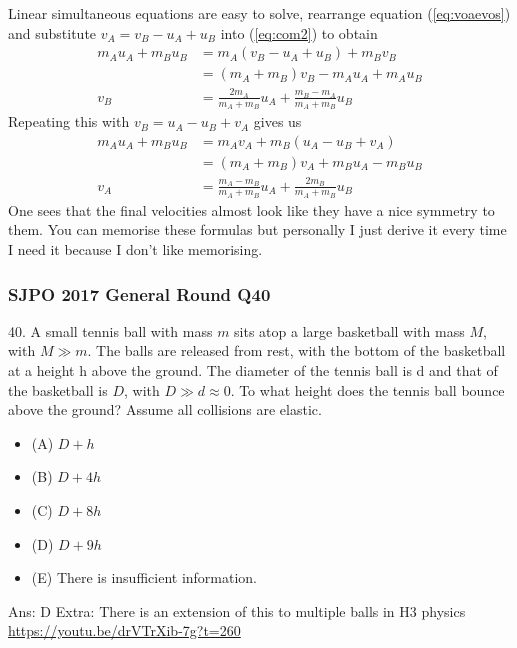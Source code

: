 \documentclass{article}
\begin{document}
Linear simultaneous equations are easy to solve, rearrange equation (\ref{eq:voaevos}) and substitute $v_A = v_B - u_A + u_B$ into (\ref{eq:com2}) to obtain
\begin{align}
    m_A u_A + m_B u_B &= m_A (v_B - u_A + u_B) + m_B v_B \\
    &= (m_A + m_B) v_B - m_A u_A + m_A u_B \\
    v_B &= \frac{2m_A}{m_A + m_B} u_A + \frac{m_B - m_A}{m_A + m_B} u_B 
\end{align}
Repeating this with $v_B = u_A - u_B + v_A$ gives us 
\begin{align}
    m_A u_A + m_B u_B &= m_A v_A + m_B (u_A - u_B + v_A) \\
    &= (m_A + m_B) v_A + m_B u_A - m_B u_B \\
    v_A &= \frac{m_A - m_B}{m_A + m_B} u_A + \frac{2m_B}{m_A + m_B} u_B
\end{align}
One sees that the final velocities almost look like they have a nice symmetry to them. You can memorise these formulas but personally I just derive it every time I need it because I don't like memorising.
\subsubsection{SJPO 2017 General Round Q40}
40. A small tennis ball with mass $m$ sits atop a large basketball with mass $M$, with $M \gg m$. The balls are released from rest, with the bottom of the basketball at a height $\mathrm{h}$ above the ground. The diameter of the tennis ball is d and that of the basketball is $D$, with $D \gg d \approx 0$. To what height does the tennis ball bounce above the ground? Assume all collisions are elastic.
\begin{itemize}
\item[] (A) $D+h$
\item[] (B) $D+4 h$
\item[] (C) $D+8 h$
\item[] (D) $D+9 h$
\item[] (E) There is insufficient information.
\end{itemize}
Ans: \ifpaper D \fi
Extra: There is an extension of this to multiple balls in H3 physics \url{https://youtu.be/drVTrXib-7g?t=260}
\end{document}
